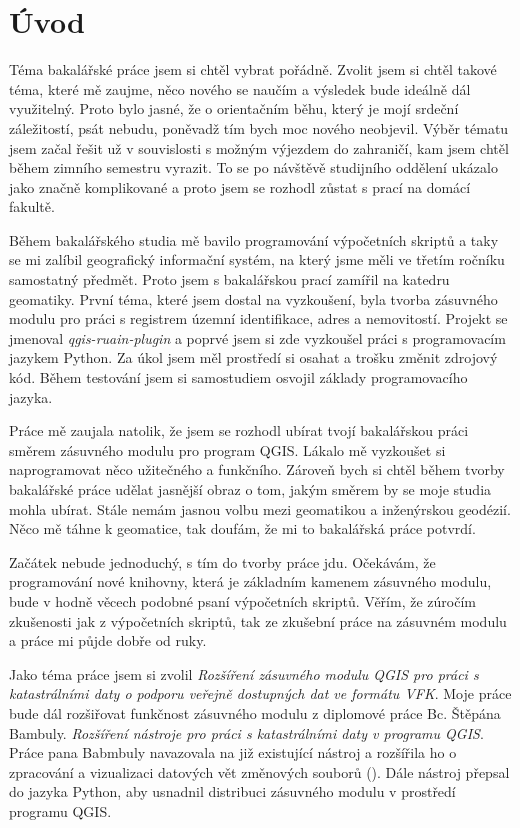 \chapter{Úvod}
\label{1-uvod}
Téma bakalářské práce jsem si chtěl vybrat pořádně. Zvolit jsem si chtěl takové téma, které mě zaujme, něco nového se naučím a výsledek bude ideálně dál využitelný. Proto bylo jasné, že o orientačním běhu, který je mojí srdeční záležitostí, psát nebudu, poněvadž tím bych moc nového neobjevil. Výběr tématu jsem začal řešit už v souvislosti s možným výjezdem do zahraničí, kam jsem chtěl během zimního semestru vyrazit. To se po návštěvě studijního oddělení ukázalo jako značně komplikované a proto jsem se rozhodl zůstat s prací na domácí fakultě.

Během bakalářského studia mě bavilo programování výpočetních skriptů a taky se mi zalíbil geografický informační systém, na který jsme měli ve třetím ročníku samostatný předmět. Proto jsem s bakalářskou prací zamířil na katedru geomatiky. První téma, které jsem dostal na vyzkoušení, byla tvorba zásuvného modulu pro práci s registrem územní identifikace, adres a nemovitostí. Projekt se jmenoval \textit{qgis-ruain-plugin} a poprvé jsem si zde vyzkoušel práci s programovacím jazykem Python. Za úkol jsem měl prostředí si osahat a trošku změnit zdrojový kód. Během testování jsem si samostudiem osvojil základy programovacího jazyka.

Práce mě zaujala natolik, že jsem se rozhodl ubírat tvojí bakalářskou práci směrem zásuvného modulu pro program QGIS. Lákalo mě vyzkoušet si naprogramovat něco užitečného a funkčního. Zároveň bych si chtěl během tvorby bakalářské práce udělat jasnější obraz o tom, jakým směrem by se moje studia mohla ubírat. Stále nemám jasnou volbu mezi geomatikou a inženýrskou geodézií. Něco mě táhne k geomatice, tak doufám, že mi to bakalářská práce potvrdí.

Začátek nebude jednoduchý, s tím do tvorby práce jdu. Očekávám, že programování nové knihovny, která je základním kamenem zásuvného modulu, bude v hodně věcech podobné psaní výpočetních skriptů.  Věřím, že zúročím zkušenosti jak z výpočetních skriptů, tak ze zkušební práce na zásuvném modulu a práce mi půjde dobře od ruky.

Jako téma práce jsem si zvolil \textit{Rozšíření zásuvného modulu QGIS pro práci s katastrálními daty o podporu veřejně dostupných dat ve formátu VFK}.  Moje práce bude dál rozšiřovat funkčnost zásuvného modulu z diplomové práce Bc. Štěpána Bambuly. \textit{Rozšíření nástroje pro práci s katastrálními daty v programu QGIS}. Práce pana Babmbuly navazovala na již existující nástroj a rozšířila ho o zpracování a vizualizaci datových vět změnových souborů (). Dále nástroj přepsal do jazyka Python, aby usnadnil distribuci zásuvného modulu v prostředí programu QGIS.

